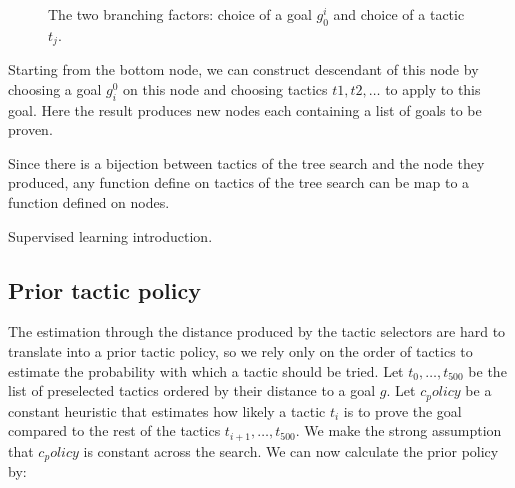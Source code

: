 \documentclass[runningheads,a4paper,draft]{svjour3}
\begin{document}
\begin{figure}{}
\begin{center}
\end{center}
\caption{The two branching factors: choice of a goal $g_0^i$ and choice of a 
tactic $t_j$.}
\label{fig:choice}
\end{figure}

Starting from the bottom node, we can construct descendant of this node by 
choosing a goal $g_i^0$ on this node and choosing tactics $t1,t2,\ldots$ to 
apply to this goal. Here the result produces new nodes each containing a list 
of goals to be proven. 


Since there is a bijection between tactics of the tree search 
and the node they 
produced, any function define on tactics of the tree search can be map to a 
function defined on nodes. 


Supervised learning introduction.
\subsection{Prior tactic policy}

The estimation through the distance produced by the tactic selectors are hard 
to translate into a prior tactic policy, so we rely only on the order of 
tactics to estimate the probability with which a tactic should be tried.
Let $t_0,\ldots,t_500$ be the list of preselected tactics ordered by their 
distance to a goal $g$. Let $c_policy$ be a constant heuristic that estimates 
how likely a tactic $t_i$ is to prove the goal compared to the rest of the 
tactics $t_{i+1},\ldots,t_500$. We make the strong assumption that $c_policy$ 
is constant across the search. We can now calculate the prior policy by:
\end{document}
